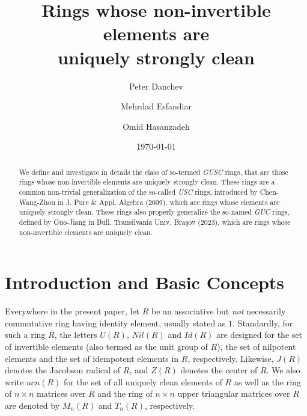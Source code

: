\documentclass[12pt]{amsart}
\date\today
\theoremstyle{definition}
\begin{document}
\author[P. Danchev]{Peter Danchev}
\address{Institute of Mathematics and Informatics, Bulgarian Academy of Sciences, 1113 Sofia, Bulgaria}

\author[M. Esfandiar]{Mehrdad Esfandiar}
\address{Department of Mathematics and Computer Science Shahed University Tehran, Iran}

\author[O. Hasanzadeh]{Omid Hasanzadeh}
\address{Department of Mathematics, Tarbiat Modares University, 14115-111 Tehran Jalal AleAhmad Nasr, Iran}

\title[Rings whose non-units elements are uniquely strongly clean]{\small Rings whose non-invertible elements are \\ uniquely strongly clean}

\maketitle

\begin{abstract}
We define and investigate in details the class of so-termed {\it GUSC} rings, that are those rings whose non-invertible elements are uniquely strongly clean. These rings are a common non-trivial generalization of the so-called {\it USC} rings, introduced by Chen-Wang-Zhou in J. Pure \& Appl. Algebra (2009), which are rings whose elements are uniquely strongly clean. These rings also properly generalize the so-named {\it GUC} rings, defined by Guo-Jiang in Bull. Transilvania Univ. Bra\c{s}ov (2023), which are rings whose non-invertible elements are uniquely clean.
\end{abstract}

\section{Introduction and Basic Concepts}

Everywhere in the present paper, let $R$ be an associative but {\it not} necessarily commutative ring having identity element, usually stated as $1$. Standardly, for such a ring $R$, the letters $U(R)$, $Nil(R)$ and $Id(R)$ are designed for the set of invertible elements (also termed as the unit group of $R$), the set of nilpotent elements and the set of idempotent elements in $R$, respectively. Likewise, $J(R)$ denotes the Jacobson radical of $R$, and $Z(R)$ denotes the center of $R$. We also write $ucn(R)$ for the set of all uniquely clean elements of $R$ as well as the ring of $n\times n$ matrices over $R$ and the ring of $n\times n$ upper triangular matrices over $R$ are denoted by $M_{n}(R)$ and $T_{n}(R)$, respectively.
\end{document}
